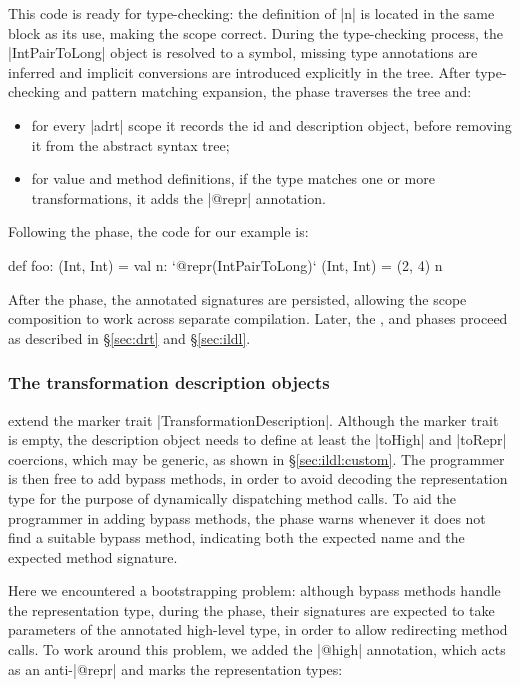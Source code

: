 This code is ready for type-checking: the definition of |n| is located in the same block as its use, making the scope correct. During the type-checking process, the |IntPairToLong| object is resolved to a symbol, missing type annotations are inferred and implicit conversions are introduced explicitly in the tree. After type-checking and pattern matching expansion, the \inject{} phase traverses the tree and:

\vspace{0.3em}
\begin{itemize}
\item for every |adrt| scope it records the id and description object, before removing it from the abstract syntax tree;
\item for value and method definitions, if the type matches one or more transformations, it adds the |@repr| annotation.
\end{itemize}
\vspace{0.3em}

\noindent Following the \inject{} phase, the code for our example is:

\begin{lstlisting-nobreak}
def foo: (Int, Int) = {
  val n: `@repr(IntPairToLong)` (Int, Int) = (2, 4)
  n
}
\end{lstlisting-nobreak}

\noindent
After the \inject{} phase, the annotated signatures are persisted, allowing the scope composition to work across separate compilation.
Later, the \bridge{}, \coerce{} and \commit{} phases proceed as described in \S\ref{sec:drt} and \S\ref{sec:ildl}.

\subsubsection{The transformation description objects} extend the marker trait |TransformationDescription|. Although the marker trait is empty, the description object needs to define at least the |toHigh| and |toRepr| coercions, which may be generic, as shown in \S\ref{sec:ildl:custom}. The programmer is then free to add bypass methods, in order to avoid decoding the representation type for the purpose of dynamically dispatching method calls. To aid the programmer in adding bypass methods, the \coerce{} phase warns whenever it does not find a suitable bypass method, indicating both the expected name and the expected method signature. 

Here we encountered a bootstrapping problem: although bypass methods handle the representation type, during the \coerce{} phase, their signatures are expected to take parameters of the annotated high-level type, in order to allow redirecting method calls. To work around this problem, we added the |@high| annotation, which acts as an anti-|@repr| and marks the representation types:

